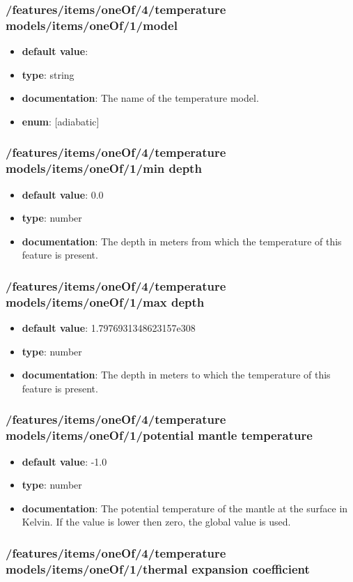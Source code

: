 \subsubsection{/features/items/oneOf/4/temperature models/items/oneOf/1/model}
\begin{itemize}\item {\bf default value}: 
\item {\bf type}: string
\item {\bf documentation}: The name of the temperature model.
\item {\bf enum}: [adiabatic]\end{itemize}\subsubsection{/features/items/oneOf/4/temperature models/items/oneOf/1/min depth}
\begin{itemize}\item {\bf default value}: 0.0
\item {\bf type}: number
\item {\bf documentation}: The depth in meters from which the temperature of this feature is present.
\end{itemize}\subsubsection{/features/items/oneOf/4/temperature models/items/oneOf/1/max depth}
\begin{itemize}\item {\bf default value}: 1.7976931348623157e308
\item {\bf type}: number
\item {\bf documentation}: The depth in meters to which the temperature of this feature is present.
\end{itemize}\subsubsection{/features/items/oneOf/4/temperature models/items/oneOf/1/potential mantle temperature}
\begin{itemize}\item {\bf default value}: -1.0
\item {\bf type}: number
\item {\bf documentation}: The potential temperature of the mantle at the surface in Kelvin. If the value is lower then zero, the global value is used.
\end{itemize}\subsubsection{/features/items/oneOf/4/temperature models/items/oneOf/1/thermal expansion coefficient}
